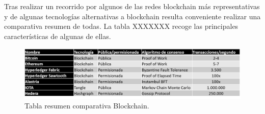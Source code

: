 Tras realizar un recorrido por algunos de las redes blockchain más representativas y de algunas tecnologías alternativas a blockchain resulta conveniente realizar una comparativa resumen de todas. La tabla XXXXXXX recoge las principales características de algunas de ellas.


\begin{figure}
	\centering
	\includegraphics[width=1\textwidth]{imagenes/Tablacomparativa.png}
	\caption{\label{fig1}Tabla resumen comparativa Blockchain.}
\end{figure}




